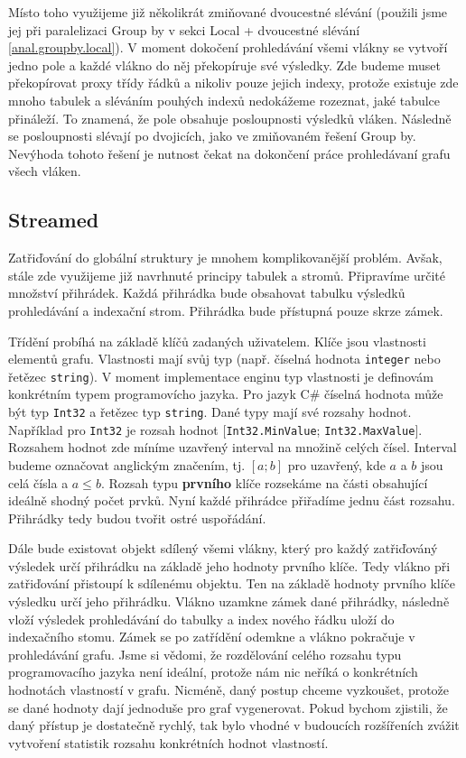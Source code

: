 Místo toho využijeme již několikrát zmiňované dvoucestné slévání (použili jsme jej při paralelizaci Group by v sekci Local + dvoucestné slévání \ref{anal.groupby.local}).
V moment dokočení prohledávání všemi vlákny se vytvoří jedno pole a každé vlákno do něj překopíruje své výsledky.
Zde budeme muset překopírovat proxy třídy řádků a nikoliv pouze jejich indexy, protože existuje zde mnoho tabulek a sléváním pouhých indexů nedokážeme rozeznat, jaké tabulce přináleží.
To znamená, že pole obsahuje posloupnosti výsledků vláken.
Následně se posloupnosti slévají po dvojicích, jako ve zmiňovaném řešení Group by. 
Nevýhoda tohoto řešení je nutnost čekat na dokončení práce prohledávaní grafu všech vláken.
 
\subsection{Streamed} \label{anal.improvement.orderby.streamed}

Zatřiďování do globální struktury je mnohem komplikovanější problém.
Avšak, stále zde využijeme již navrhnuté principy tabulek a stromů.
Připravíme určité množství přihrádek.
Každá přihrádka bude obsahovat tabulku výsledků prohledávání a indexační strom.
Přihrádka bude přístupná pouze skrze zámek.

Třídění probíhá na základě klíčů zadaných uživatelem.
Klíče jsou vlastnosti elementů grafu.
Vlastnosti mají svůj typ (např. číselná hodnota \texttt{integer} nebo řetězec \texttt{string}).
V moment implementace enginu typ vlastnosti je definovám konkrétním typem programovícho jazyka.
Pro jazyk C\# číselná hodnota může být typ \texttt{Int32} a řetězec typ \texttt{string}.
Dané typy mají své rozsahy hodnot.
Například pro \texttt{Int32} je rozsah hodnot $[$\texttt{Int32.MinValue}; \texttt{Int32.MaxValue}$]$.
Rozsahem hodnot zde míníme uzavřený interval na množině celých čísel.
Interval budeme označovat anglickým značením, tj. $[a; b]$ pro uzavřený, kde $a$ a $b$ jsou celá čísla a $a\leq b$.
Rozsah typu \textbf{prvního} klíče rozsekáme na části obsahující ideálně shodný počet prvků. 
Nyní každé přihrádce přiřadíme jednu část rozsahu. 
Přihrádky tedy budou tvořit ostré uspořádání.

Dále bude existovat objekt sdílený všemi vlákny, který pro každý zatřiďováný výsledek určí přihrádku na základě jeho hodnoty prvního klíče.
Tedy vlákno při zatřiďování přistoupí k sdílenému objektu.
Ten na základě hodnoty prvního klíče výsledku určí jeho přihrádku.
Vlákno uzamkne zámek dané přihrádky, následně vloží výsledek prohledávání do tabulky a index nového řádku uloží do indexačního stomu.
Zámek se po zatřídění odemkne a vlákno pokračuje v prohledávání grafu.
Jsme si vědomi, že rozdělování celého rozsahu typu programovacího jazyka není ideální, protože nám nic neříká o konkrétních hodnotách vlastností v grafu.
Nicméně, daný postup chceme vyzkoušet, protože se dané hodnoty dají jednoduše pro graf vygenerovat.
Pokud bychom zjistili, že daný přístup je dostatečně rychlý, tak bylo vhodné v budoucích rozšířeních zvážit vytvoření statistik rozsahu konkrétních hodnot vlastností.

